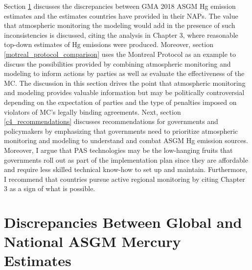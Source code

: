 \begin{flushleft}
Section \ref{nap_gma18_differences} discusses the discrepancies between GMA 2018 ASGM Hg emission estimates and the estimates countries have provided in their NAPs. The value that atmospheric monitoring the modeling would add in the presence of such inconsistencies is discussed, citing the analysis in Chapter 3, where reasonable top-down estimates of Hg emissions were produced. Moreover, section \ref{motreal_protocol_comparison} uses the Montreal Protocol as an example to discuss the possibilities provided by combining atmospheric monitoring and modeling to inform actions by parties as well as evaluate the effectiveness of the MC. The discussion in this section drives the point that atmospheric monitoring and modeling provides valuable information but may be politically controversial depending on the expectation of parties and the type of penalties imposed on violators of MC's legally binding agreements. Next, section \ref{c4_recommendations} discusses recommendations for governments and policymakers by emphasizing that governments need to prioritize atmospheric monitoring and modeling to understand and combat ASGM Hg emission sources.
Moreover, I argue that PAS technologies may be the low-hanging fruits that governments roll out as part of the implementation plan since they are affordable and require less skilled technical know-how to set up and maintain. Furthermore, I recommend that countries pursue active regional monitoring by citing Chapter 3 as a sign of what is possible.

\end{flushleft}

\section{Discrepancies Between Global and National ASGM Mercury Estimates}\label{nap_gma18_differences}

